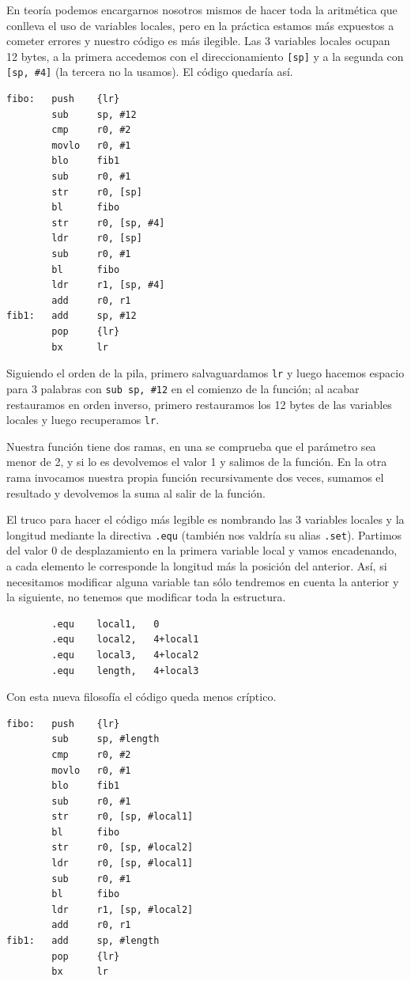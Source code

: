 En teoría podemos encargarnos nosotros mismos de hacer toda la aritmética que conlleva el
uso de variables locales, pero en la práctica estamos más expuestos a cometer errores y
nuestro código es más ilegible. Las 3 variables locales ocupan 12 bytes, a la primera
accedemos con el direccionamiento {\tt [sp]} y a la segunda con {\tt [sp, \#4]} (la tercera
no la usamos). El código quedaría así.

\begin{lstlisting}
fibo:   push    {lr}
        sub     sp, #12
        cmp     r0, #2
        movlo   r0, #1
        blo     fib1
        sub     r0, #1
        str     r0, [sp]
        bl      fibo
        str     r0, [sp, #4]
        ldr     r0, [sp]
        sub     r0, #1
        bl      fibo
        ldr     r1, [sp, #4]
        add     r0, r1
fib1:   add     sp, #12
        pop     {lr}
        bx      lr
\end{lstlisting}

Siguiendo el orden de la pila, primero salvaguardamos {\tt lr} y luego hacemos espacio para
3 palabras con {\tt sub sp, \#12} en el comienzo de la función; al acabar restauramos en orden
inverso, primero restauramos los 12 bytes de las variables locales y luego recuperamos {\tt lr}.

Nuestra función tiene dos ramas, en una se comprueba que el parámetro sea menor de 2, y si lo
es devolvemos el valor 1 y salimos de la función. En la otra rama invocamos nuestra propia
función recursivamente dos veces, sumamos el resultado y devolvemos la suma al salir de la
función.

El truco para hacer el código más legible es nombrando las 3 variables locales y la longitud
mediante la directiva {\tt .equ} (también nos valdría su alias {\tt .set}). Partimos del valor
0 de desplazamiento en la primera variable local y vamos encadenando, a cada elemento le
corresponde la longitud más la posición del anterior. Así, si necesitamos modificar alguna
variable tan sólo tendremos en cuenta la anterior y la siguiente, no tenemos que modificar
toda la estructura.

\begin{lstlisting}
        .equ    local1,   0
        .equ    local2,   4+local1
        .equ    local3,   4+local2
        .equ    length,   4+local3
\end{lstlisting}

Con esta nueva filosofía el código queda menos críptico.

\begin{lstlisting}
fibo:   push    {lr}
        sub     sp, #length
        cmp     r0, #2
        movlo   r0, #1
        blo     fib1
        sub     r0, #1
        str     r0, [sp, #local1]
        bl      fibo
        str     r0, [sp, #local2]
        ldr     r0, [sp, #local1]
        sub     r0, #1
        bl      fibo
        ldr     r1, [sp, #local2]
        add     r0, r1
fib1:   add     sp, #length
        pop     {lr}
        bx      lr
\end{lstlisting}

